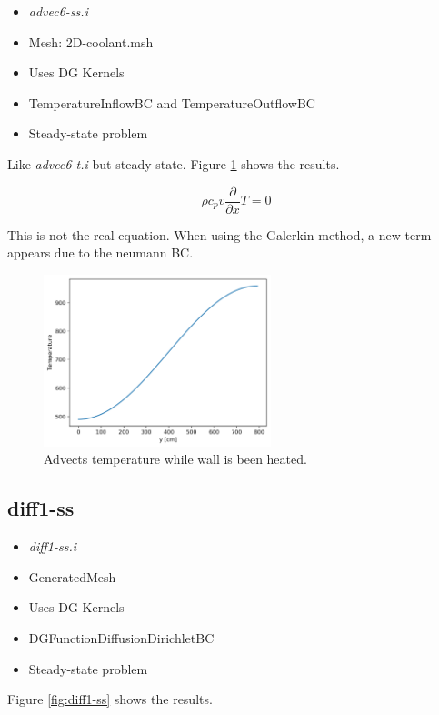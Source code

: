 \documentclass[11pt,letterpaper]{article}
\begin{document}
	\begin{itemize}
		\item \textit{advec6-ss.i}
		\item Mesh: 2D-coolant.msh
		\item Uses DG Kernels
		\item TemperatureInflowBC and TemperatureOutflowBC
		\item Steady-state problem
	\end{itemize}

    Like \textit{advec6-t.i} but steady state.
    Figure \ref{fig:advec6-ss} shows the results.

	\begin{equation}
    \rho c_p v \frac{\partial}{\partial x} T = 0
	\end{equation}

	This is not the real equation. When using the Galerkin method, a new term appears due to the neumann BC.

	\begin{figure}[htbp!]
		\centering
		\includegraphics[height=5cm]{advec6-ss}
		\caption{Advects temperature while wall is been heated.}
		\label{fig:advec6-ss}
	\end{figure}

	\subsection{diff1-ss}

	\begin{itemize}
		\item \textit{diff1-ss.i}
		\item GeneratedMesh
		\item Uses DG Kernels
		\item DGFunctionDiffusionDirichletBC
		\item Steady-state problem
	\end{itemize}

    Figure \ref{fig:diff1-ss} shows the results.
\end{document}
